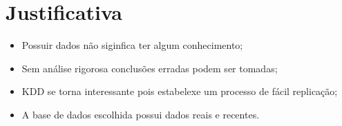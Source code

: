 \section{Justificativa}

\begin{frame}
	\begin{itemize}
		\item Possuir dados não siginfica ter algum conhecimento;
		\item Sem análise rigorosa conclusões erradas podem ser tomadas;
		\item KDD se torna interessante pois estabelexe um processo de fácil replicação;
		\item A base de dados escolhida possui dados reais e recentes.
	\end{itemize}
\end{frame}